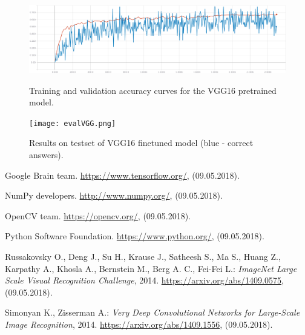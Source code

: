 \documentclass[a4paper]{article}
\begin{document}
\begin{figure}[h]
    \caption[]{Training and validation accuracy curves for the VGG16 pretrained model.}
    \centering
    \includegraphics[page=2,width=1.0\textwidth]{vggTraining_accuracy.png}
    \label{fig:trainingVGG_accuracy}
\end{figure}


\begin{figure}[h]
    \caption[]{Results on testset of VGG16 finetuned model (blue - correct answers).}
    \centering
    \texttt{[image: evalVGG.png]}
    \label{fig:evalVGG}
\end{figure}



\clearpage
\begin{thebibliography}{99}

 Google Brain team. \url{https://www.tensorflow.org/}, (09.05.2018).

 NumPy developers. \url{http://www.numpy.org/}, (09.05.2018).

 OpenCV team. \url{https://opencv.org/}, (09.05.2018).

 Python Software Foundation. \url{https://www.python.org/}, (09.05.2018).

Russakovsky O., Deng J., Su H., Krause J., Satheesh S., Ma S., Huang Z., Karpathy A., Khosla A., Bernstein M., Berg A. C., Fei-Fei L.: \textit{ImageNet Large Scale Visual Recognition Challenge}, 2014. 
\url{https://arxiv.org/abs/1409.0575}, (09.05.2018).

Simonyan K., Zisserman A.: \textit{Very Deep Convolutional Networks for Large-Scale Image Recognition}, 2014. \url{https://arxiv.org/abs/1409.1556}, (09.05.2018).

\end{thebibliography}
\end{document}
